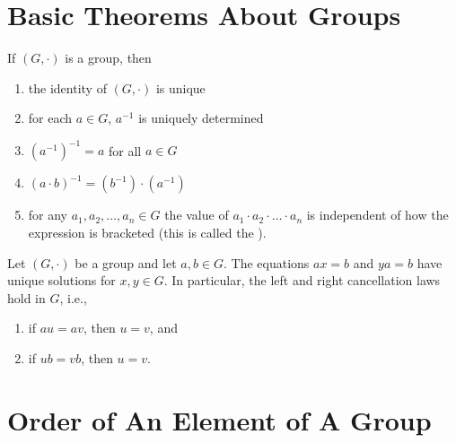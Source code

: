 
\newpage

\section{Basic Theorems About Groups}

\begin{theorem}
	If $(G, \cdot)$ is a group, then
	\begin{enumerate}
		\item the identity of $(G, \cdot)$ is unique
		
		\item for each $a \in G$, $a^{-1}$ is uniquely determined
		
		\item $(a^{-1})^{-1} = a$ for all $a \in G$
		
		\item $(a \cdot b)^{-1} = (b^{-1}) \cdot (a^{-1})$
		
		\item for any $a_1, a_2, \dots, a_n \in G$ the value of 
		$a_1 \cdot a_2 \cdot \dots \cdot a_n$ is independent of how 
		the expression is bracketed (this is called the 
		).
	\end{enumerate}
\end{theorem}

\begin{theorem}
	Let $(G, \cdot)$ be a group and let $a,b \in G$. The equations 
	$ax = b$ 
	and $ya = b$ have unique solutions for $x,y \in G$. In 
	particular, the left and right cancellation laws hold in $G$, 
	i.e.,
	\begin{enumerate}
		\item if $au = av$, then $u=v$, and
		
		\item if $ub=vb$, then $u=v$.
	\end{enumerate}
\end{theorem}


\newpage

\section{Order of An Element of A Group}

